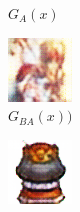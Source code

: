 \documentclass{beamer}
\begin{document}
\begin{frame}
\begin{figure}[htb]
\begin{subfigure}[b]{0.23\linewidth}
        \caption{$G_A(x)$}
      \end{subfigure}
      \begin{subfigure}[b]{0.23\linewidth}
        \includegraphics[width=\linewidth]{exp2_epoch004_rec_A.png}
        \caption{$G_{BA}(x))$}
      \end{subfigure}
      \begin{subfigure}[b]{0.23\linewidth}
        \includegraphics[width=\linewidth]{exp2_epoch004_idt_A.png}

\end{subfigure}
\end{figure}
\end{frame}
\end{document}
